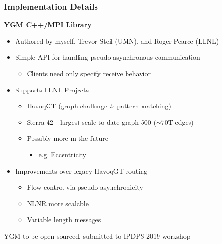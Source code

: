 \documentclass{beamer}
\newcommand{\algoname}[1]{\textnormal{\textsc{#1}}}
\begin{document}
\begin{frame}
\frametitle{Implementation Details}


\textbf{\algoname{YGM} C++/MPI Library}
\begin{itemize}
	\item Authored by myself, Trevor Steil (UMN), and Roger Pearce (LLNL)
	\item Simple API for handling pseudo-asynchronous communication
	\begin{itemize}
		\item Clients need only specify receive behavior
	\end{itemize}
	\item Supports LLNL Projects
	\begin{itemize}
		\item HavoqGT (graph challenge \& pattern matching)
		\item Sierra 42 - largest scale to date graph 500 ($\sim 70$T edges)
		\item Possibly more in the future
		\begin{itemize}
			\item e.g. Eccentricity
		\end{itemize}
	\end{itemize}
	\item Improvements over legacy HavoqGT routing
	\begin{itemize}
		\item Flow control via pseudo-asynchronicity 
		\item NLNR more scalable
		\item Variable length messages
	\end{itemize}
\end{itemize}

\begin{block}{}
	\begin{center}
		\algoname{YGM} to be open sourced, submitted to IPDPS 2019 workshop
	\end{center}
\end{block}

\end{frame}


\end{document}
